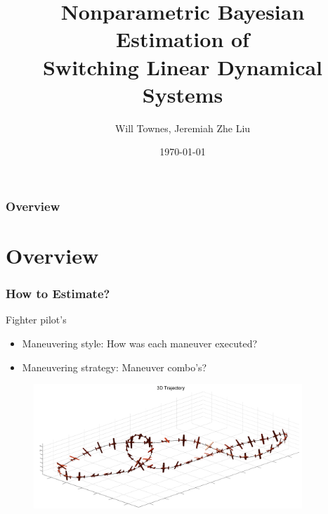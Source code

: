 \documentclass{beamer}
\title[HDP-HMM-SLDS]{Nonparametric Bayesian Estimation of\\  Switching Linear Dynamical Systems} %
\author{Will Townes, Jeremiah Zhe Liu} %
\date{\today} %
\begin{document}
\begin{frame}
\titlepage %
\end{frame}

\begin{frame}
\frametitle{Overview} %
\tableofcontents %
\end{frame}


\section{Overview}
\begin{frame}
\frametitle{How to Estimate?}
Fighter pilot's
\begin{itemize}
\item Maneuvering style: How was each maneuver executed?
\item Maneuvering strategy: Maneuver combo's?
\end{itemize}

\begin{figure}
\includegraphics[width=0.9\textwidth]{"./plot/trajectory"}
\end{figure}
\end{frame}
\end{document}

